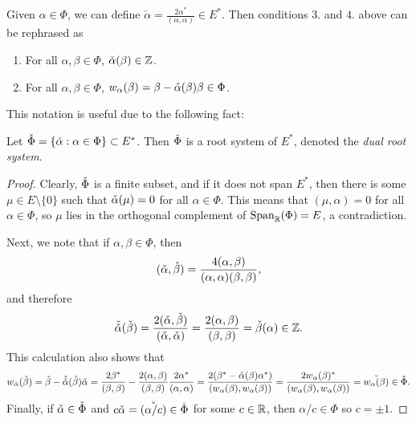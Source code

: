 Given $\alpha\in\Phi$, we can define $\check{\alpha}=\frac{2\alpha^*}{(\alpha,\alpha)}\in E^*$. Then conditions $3.$ and $4.$ above can be rephrased as
\begin{enumerate}[start=3]
    \item For all $\alpha,\beta\in\Phi$, $\check{\alpha}(\beta)\in\mathbb{Z}$.
    \item For all $\alpha,\beta\in\Phi$, $w_\alpha(\beta)=\beta-\check{\alpha}(\beta)\beta\in\Phi$.
\end{enumerate}

This notation is useful due to the following fact:

\begin{lemma}
    Let $\check{\Phi}=\{\check{\alpha}:\alpha\in\Phi\}\subset E^*$. Then $\check{\Phi}$ is a root system of $E^*$, denoted the \textit{dual root system}.
\end{lemma}
\begin{proof}
    Clearly, $\check{\Phi}$ is a finite subset, and if it does not span $E^*$, then there is some $\mu\in E\setminus\{0\}$ such that $\check{\alpha}(\mu)=0$ for all $\alpha\in\Phi$. This means that $(\mu,\alpha)=0$ for all $\alpha\in\Phi$, so $\mu$ lies in the orthogonal complement of $\mathrm{Span}_{\mathbb{R}}(\Phi)=E$, a contradiction.

    Next, we note that if $\alpha,\beta\in\Phi$, then 
    $$(\check{\alpha},\check{\beta})=\frac{4(\alpha,\beta)}{(\alpha,\alpha)(\beta,\beta)},$$
    and therefore 
    $$\check{\check{\alpha}}(\check{\beta})=\frac{2(\check{\alpha},\check{\beta})}{(\check{\alpha},\check{\alpha})}=\frac{2(\alpha,\beta)}{(\beta,\beta)}=\check{\beta}(\alpha)\in \mathbb{Z}.$$
    This calculation also shows that 
    $$w_{\check{\alpha}}(\check{\beta})=\check{\beta}-\check{\check{\alpha}}(\check{\beta})\check{\alpha}=\frac{2\beta^*}{(\beta,\beta)}-\frac{2(\alpha,\beta)}{(\beta,\beta)}\frac{2\alpha^*}{(\alpha,\alpha)}=\frac{2(\beta^*-\check{\alpha}(\beta)\alpha^*)}{(w_\alpha(\beta),w_\alpha(\beta))}=\frac{2w_\alpha(\beta)^*}{(w_\alpha(\beta),w_\alpha(\beta))}=\check{w_\alpha(\beta)}\in\check{\Phi}.$$
    Finally, if $\check{\alpha}\in\check{\Phi}$ and $c\check{\alpha}=\check{(\alpha/c)}\in\check{\Phi}$ for some $c\in\mathbb{R}$, then $\alpha/c\in\Phi$ so $c=\pm1$.
\end{proof}

